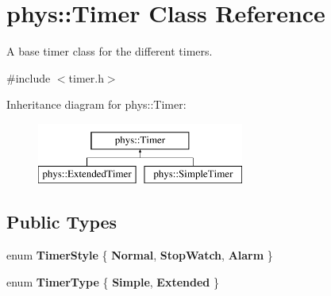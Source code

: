 \hypertarget{classphys_1_1Timer}{
\section{phys::Timer Class Reference}
\label{d3/d83/classphys_1_1Timer}
}


A base timer class for the different timers.  




{\ttfamily \#include $<$timer.h$>$}

Inheritance diagram for phys::Timer:\begin{figure}[H]
\begin{center}
\leavevmode
\includegraphics[height=2.000000cm]{d3/d83/classphys_1_1Timer}
\end{center}
\end{figure}
\subsection*{Public Types}
\begin{DoxyCompactItemize}
\item 
enum {\bfseries TimerStyle} \{ {\bfseries Normal}, 
{\bfseries StopWatch}, 
{\bfseries Alarm}
 \}
\item 
enum {\bfseries TimerType} \{ {\bfseries Simple}, 
{\bfseries Extended}
 \}
\end{DoxyCompactItemize}
